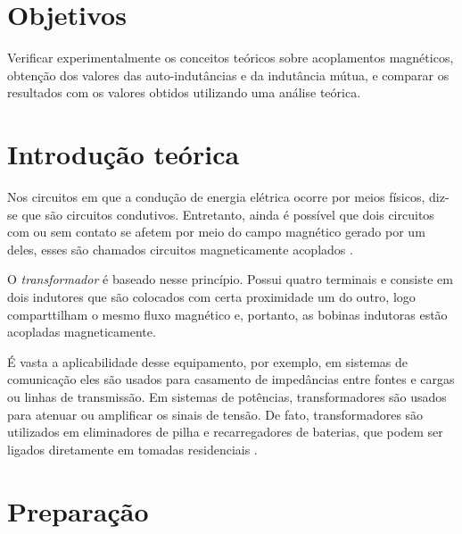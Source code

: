 \documentclass[a4paper,12pt,oneside,openany,table,xcdraw]{article}
\begin{document}
\newcommand{\thedepartment}{Faculdade de Engenharia Elétrica}
\newcommand{\thecourse}{FEELT}
\newcommand{\thetitle}{CIRCUITOS ACOPLADOS MAGNETICAMENTE}
\newcommand{\thetype}{Relatório da Disciplina de Circuitos Elétricos II}
\newcommand{\theproftitle}{Bacharel em Engenharia Elétrica}
\newcommand{\thestudent}{Lesly Viviane Montúfar Berrios\\
\centering11811ETE001}
\newcommand{\theadvisor}{Prof. Wellington Maycon Santos Bernardes}
\newcommand{\thecity}{Uberlândia}

\thispagestyle{empty}


\onehalfspacing
\tableofcontents %
\newpage

\section{Objetivos} %
Verificar experimentalmente os conceitos teóricos sobre acoplamentos magnéticos,
obtenção dos valores das auto-indutâncias e da indutância mútua, e comparar os resultados
com os valores obtidos utilizando uma análise teórica.

\section{Introdução teórica} %
Nos circuitos em que a condução de energia elétrica ocorre por meios físicos, diz-se que são circuitos condutivos. Entretanto, ainda é possível que dois circuitos com ou sem contato se afetem por meio do campo magnético gerado por um deles, esses são chamados circuitos magneticamente acoplados \cite{ph}.

O \emph{transformador} é baseado nesse princípio. Possui quatro terminais e consiste em dois indutores que são colocados com certa proximidade um do outro, logo comparttilham o mesmo fluxo magnético e, portanto, as bobinas indutoras estão acopladas magneticamente. 

É vasta a aplicabilidade desse equipamento, por exemplo, em sistemas de comunicação eles são usados para casamento de impedâncias entre fontes e cargas ou linhas de transmissão. Em sistemas de potências, transformadores são usados para atenuar ou amplificar os sinais de tensão. De fato, transformadores são utilizados em eliminadores de pilha e recarregadores de baterias, que podem ser ligados diretamente em tomadas residenciais \cite{irwin}.


\section{Preparação}
\end{document}
